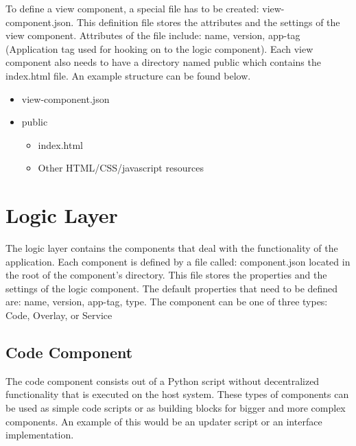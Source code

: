 To define a view component, a special file has to be created: view-component.json. This definition file stores the attributes and the settings of the view component. Attributes of the file include: name, version, app-tag (Application tag used for hooking on to the logic component). Each view component also needs to have a directory named public which contains the index.html file. An example structure can be found below.

\begin{itemize}
	\item view-component.json
	\item public \begin{itemize}
		\item index.html
		\item Other HTML/CSS/javascript resources
	\end{itemize}
\end{itemize}


\section{Logic Layer}


The logic layer contains the components that deal with the functionality of the application. Each component is defined by a file called: component.json located in the root of the component's directory. This file stores the properties and the settings of the logic component. The default properties that need to be defined are: name, version, app-tag, type. The component can be one of three types: Code, Overlay, or Service

\subsection{Code Component}

The code component consists out of a Python script without decentralized functionality that is executed on the host system. These types of components can be used as simple code scripts or as building blocks for bigger and more complex components. An example of this would be an updater script or an interface implementation.

